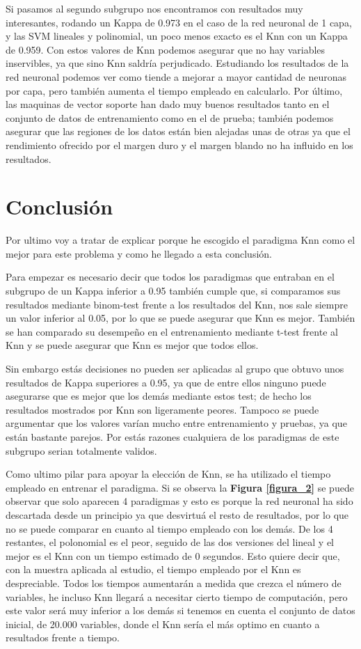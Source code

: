 \documentclass[10pt,twocolumn,letterpaper,a4paper]{article}
\begin{document}
Si pasamos al segundo subgrupo nos encontramos con resultados muy interesantes, rodando un Kappa de 0.973  en el caso de la red neuronal de 1 capa, y las SVM lineales y polinomial, un poco menos exacto es el Knn con un Kappa de 0.959. Con estos valores de Knn podemos asegurar que no hay variables inservibles, ya que sino Knn saldría perjudicado. Estudiando los resultados de la red neuronal podemos ver como tiende a mejorar a mayor cantidad de neuronas por capa, pero también aumenta el tiempo empleado en calcularlo. Por último, las maquinas de vector soporte han dado muy buenos resultados tanto en el conjunto de datos de entrenamiento como en el de prueba; también podemos asegurar que las regiones de los datos están bien alejadas unas de otras ya que el rendimiento ofrecido por el margen duro y el margen blando no ha influido en los resultados.

\section{Conclusión}

Por ultimo voy a tratar de explicar porque he escogido el paradigma Knn como el mejor para este problema y como he llegado a esta conclusión. 

Para empezar es necesario decir que todos los paradigmas que entraban en el subgrupo de un Kappa inferior a 0.95 también cumple que, si comparamos sus resultados mediante binom-test frente a los resultados del Knn, nos sale siempre un valor inferior al 0.05, por lo que se puede asegurar que Knn es mejor. También se han comparado su desempeño en el entrenamiento mediante t-test frente al Knn y se puede asegurar que Knn es mejor que todos ellos.

Sin embargo estás decisiones no pueden ser aplicadas al grupo que obtuvo unos resultados de Kappa superiores a 0.95, ya que de entre ellos ninguno puede asegurarse que es mejor que los demás mediante estos test; de hecho los resultados mostrados por Knn son ligeramente peores. Tampoco se puede argumentar que los valores varían mucho entre entrenamiento y pruebas, ya que están bastante parejos. Por estás razones cualquiera de los paradigmas de este subgrupo serian totalmente validos.

Como ultimo pilar para apoyar la elección de Knn, se ha utilizado el tiempo empleado en entrenar el paradigma. Si se observa la \textbf{Figura \ref{figura_2}} se puede observar que solo aparecen 4 paradigmas y esto es porque la red neuronal ha sido descartada desde un principio ya que desvirtuá el resto de resultados, por lo que no se puede comparar en cuanto al tiempo empleado con los demás. De los 4 restantes, el polonomial es el peor, seguido de las dos versiones del lineal y el mejor es el Knn con un tiempo estimado de 0 segundos. Esto quiere decir que, con la muestra aplicada al estudio, el tiempo empleado por el Knn es despreciable. Todos los tiempos aumentarán a medida que crezca el número de variables, he incluso Knn llegará a necesitar cierto tiempo de computación, pero este valor será muy inferior a los demás si tenemos en cuenta el conjunto de datos inicial, de 20.000 variables, donde el Knn sería el más optimo en cuanto a resultados frente a tiempo.
\end{document}
